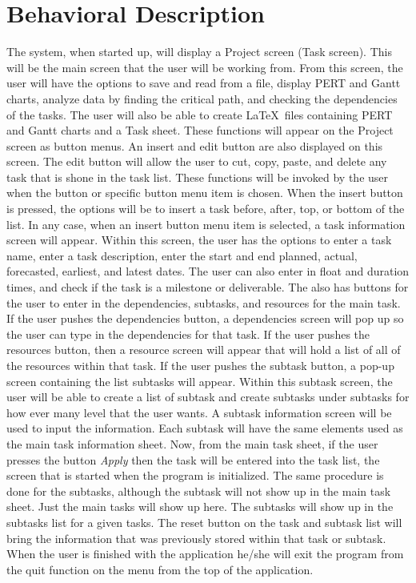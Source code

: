 %
%
\section{Behavioral Description}

The system, when started up, will display a Project screen (Task
screen). This will be the main screen that the user will be working
from. From this screen, the user will have the options to save and
read from a file, display PERT and Gantt charts, analyze data by
finding the critical path, and checking the dependencies of the tasks.
The user will also be able to create \LaTeX\ files containing PERT and
Gantt charts and a Task sheet. These functions will appear on the
Project screen as button menus. An insert and edit button are also
displayed on this screen. The edit button will allow the user to cut,
copy, paste, and delete any task that is shone in the task list. These
functions will be invoked by the user when the button or specific
button menu item is chosen. When the insert button is pressed, the
options will be to insert a task before, after, top, or bottom of the
list. In any case, when an insert button menu item is selected, a task
information screen will appear. Within this screen, the user has the
options to enter a task name, enter a task description, enter the
start and end planned, actual, forecasted, earliest, and latest dates.
The user can also enter in float and duration times, and check if the
task is a milestone or deliverable. The \tiscreen\/ also
has buttons for the user to enter in the dependencies, subtasks, and
resources for the main task. If the user pushes the dependencies
button, a dependencies screen will pop up so the user can type in the
dependencies for that task. If the user pushes the resources button,
then a resource screen will appear that will hold a list of all of the
resources within that task. If the user pushes the subtask button, a
pop-up screen containing the list subtasks will appear. Within this
subtask screen, the user will be able to create a list of subtask and
create subtasks under subtasks for how ever many level that the user
wants. A subtask information screen will be used to input the
information. Each subtask will have the same elements used as the main
task information sheet. Now, from the main task sheet, if the user
presses the button {\em Apply}\/ then the task will be entered into the
task list, the screen that is started when the program is initialized.
The same procedure is done for the subtasks, although the subtask will
not show up in the main task sheet. Just the main tasks will show up
here. The subtasks will show up in the subtasks list for a given
tasks. The reset button on the task and subtask list will bring the
information that was previously stored within that task or subtask.
When the user is finished with the application he/she will exit the
program from the quit function on the menu from the top of the
application.


